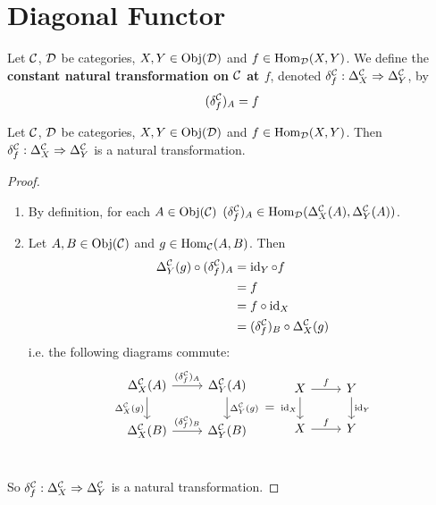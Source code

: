\documentclass{book}
\begin{document}
	
	
	
	
	
	
	
	
	\section{Diagonal Functor}

	\begin{defn} 
		Let $\mathcal{C}$, $\mathcal{D}$ be categories, $X, Y \in \operatorname{Obj}(\mathcal{D})$ and $f \in \operatorname{Hom}_{\mathcal{D}}(X, Y)$. We define the \textbf{constant natural transformation on $\mathcal{C}$ at $f$}, denoted $\delta^{\mathcal{C}}_f: \Delta^{\mathcal{C}}_X \Rightarrow \Delta^{\mathcal{C}}_Y$, by
		$$(\delta^{\mathcal{C}}_f)_A = f$$
	\end{defn}
	
	\begin{ex} 
		Let $\mathcal{C}$, $\mathcal{D}$ be categories, $X, Y \in \operatorname{Obj}(\mathcal{D})$ and $f \in \operatorname{Hom}_{\mathcal{D}}(X, Y)$. Then $\delta^{\mathcal{C}}_f: \Delta^{\mathcal{C}}_X \Rightarrow \Delta^{\mathcal{C}}_Y $ is a natural transformation.
	\end{ex}
	
	\begin{proof} \
		\begin{enumerate}
			\item By definition, for each $A \in \operatorname{Obj}(\mathcal{C})$ $(\delta^{\mathcal{C}}_f)_A \in \operatorname{Hom}_{\mathcal{D}}(\Delta^{\mathcal{C}}_X(A), \Delta^{\mathcal{C}}_Y(A))$.
			\item Let $A, B \in \operatorname{Obj}(\mathcal{C})$ and $g \in \operatorname{Hom}_{\mathcal{C}}(A, B)$. Then 
			\begin{align*}
				\Delta^{\mathcal{C}}_Y(g) \circ (\delta^{\mathcal{C}}_f)_A 
				& = \operatorname{id}_Y \circ f \\
				& = f \\
				& = f \circ \operatorname{id}_X \\
				& = (\delta^{\mathcal{C}}_f)_B \circ \Delta^{\mathcal{C}}_X(g)  
			\end{align*}
			i.e. the following diagrams commute:
			\[ 
			\begin{tikzcd}[baseline= 7]
				\Del^{\MC}_X(A)  \arrow[r, "(\del^{\MC}_f)_A"]  \arrow[d, "\Del^{\MC}_X(g)"']  & \Del^{\MC}_Y(A)   \arrow[d, "\Del^{\MC}_Y(g)"]\\
				\Del^{\MC}_X(B) \arrow[r, "(\del^{\MC}_f)_B"] &  \Del^{\MC}_Y(B) \\
			\end{tikzcd}
			=
			\begin{tikzcd}[baseline= 7]
				X  \arrow[r, "f"]  \arrow[d, "\id_X"']  & Y   \arrow[d, "\id_Y"]\\
				X \arrow[r, "f"] &  Y \\
			\end{tikzcd}
			\]
		\end{enumerate}
		So $\delta^{\mathcal{C}}_f: \Delta^{\mathcal{C}}_X \Rightarrow \Delta^{\mathcal{C}}_Y$ is a natural transformation.
	\end{proof}
	 
\end{document}
